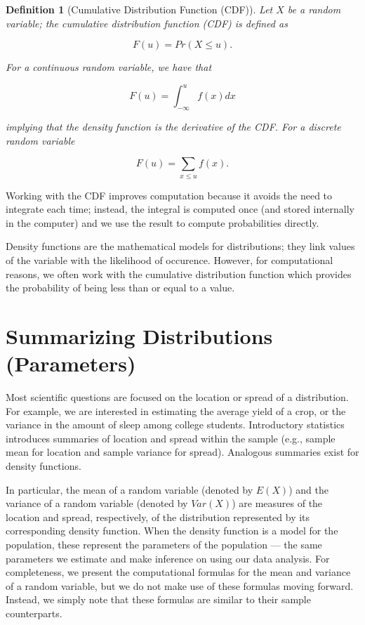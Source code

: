 \documentclass[
]{book}
\theoremstyle{plain}
\theoremstyle{mydefn}
\newtheorem{definition}{Definition}[chapter]
\theoremstyle{myexmpl}
\theoremstyle{remark}
\begin{document}
\begin{definition}[Cumulative Distribution Function (CDF)]
\protect\hypertarget{def:defn-cdf}{}{\label{def:defn-cdf} {} }Let \(X\) be a random variable; the cumulative distribution function (CDF) is defined as

\[F(u) = Pr(X \leq u).\]

For a continuous random variable, we have that

\[F(u) = \int_{-\infty}^{u} f(x) dx\]

implying that the density function is the derivative of the CDF. For a discrete random variable

\[F(u) = \sum_{x \leq u} f(x).\]
\end{definition}

Working with the CDF improves computation because it avoids the need to integrate each time; instead, the integral is computed once (and stored internally in the computer) and we use the result to compute probabilities directly.

\begin{rmdkeyidea}
Density functions are the mathematical models for distributions; they link values of the variable with the likelihood of occurence. However, for computational reasons, we often work with the cumulative distribution function which provides the probability of being less than or equal to a value.
\end{rmdkeyidea}

\hypertarget{summarizing-distributions-parameters}{%
\section{Summarizing Distributions (Parameters)}\label{summarizing-distributions-parameters}}

Most scientific questions are focused on the location or spread of a distribution. For example, we are interested in estimating the average yield of a crop, or the variance in the amount of sleep among college students. Introductory statistics introduces summaries of location and spread within the sample (e.g., sample mean for location and sample variance for spread). Analogous summaries exist for density functions.

In particular, the mean of a random variable (denoted by \(E(X)\)) and the variance of a random variable (denoted by \(Var(X)\)) are measures of the location and spread, respectively, of the distribution represented by its corresponding density function. When the density function is a model for the population, these represent the parameters of the population --- the same parameters we estimate and make inference on using our data analysis. For completeness, we present the computational formulas for the mean and variance of a random variable, but we do not make use of these formulas moving forward. Instead, we simply note that these formulas are similar to their sample counterparts.
\end{document}
